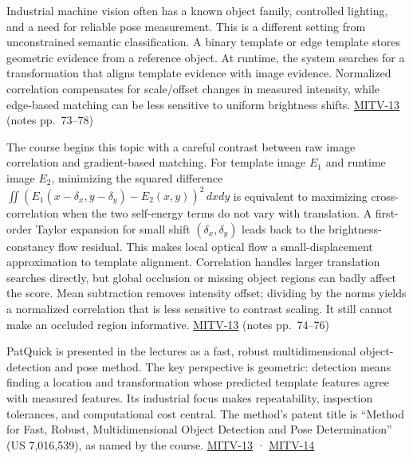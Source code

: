 Industrial machine vision often has a known object family, controlled lighting, and a need for reliable pose measurement. This is a different setting from unconstrained semantic classification. A binary template or edge template stores geometric evidence from a reference object. At runtime, the system searches for a transformation that aligns template evidence with image evidence. Normalized correlation compensates for scale/offset changes in measured intensity, while edge-based matching can be less sensitive to uniform brightness shifts. \hyperref[04-visual-computing-ii-ch036-mitv-13---object-detection-recognition-and-pose-determination-patquick-us-7016539]{MITV-13} (notes pp.~73--78)

The course begins this topic with a careful contrast between raw image correlation and gradient-based matching. For template image \(E_1\) and runtime image \(E_2\), minimizing the squared difference \(\iint(E_1(x-\delta_x,y-\delta_y)-E_2(x,y))^2\,dxdy\) is equivalent to maximizing cross-correlation when the two self-energy terms do not vary with translation. A first-order Taylor expansion for small shift \((\delta_x,\delta_y)\) leads back to the brightness-constancy flow residual. This makes local optical flow a small-displacement approximation to template alignment. Correlation handles larger translation searches directly, but global occlusion or missing object regions can badly affect the score. Mean subtraction removes intensity offset; dividing by the norms yields a normalized correlation that is less sensitive to contrast scaling. It still cannot make an occluded region informative. \hyperref[04-visual-computing-ii-ch036-mitv-13---object-detection-recognition-and-pose-determination-patquick-us-7016539]{MITV-13} (notes pp.~74--76)

PatQuick is presented in the lectures as a fast, robust multidimensional object-detection and pose method. The key perspective is geometric: detection means finding a location and transformation whose predicted template features agree with measured features. Its industrial focus makes repeatability, inspection tolerances, and computational cost central. The method's patent title is ``Method for Fast, Robust, Multidimensional Object Detection and Pose Determination'' (US 7,016,539), as named by the course. \hyperref[04-visual-computing-ii-ch036-mitv-13---object-detection-recognition-and-pose-determination-patquick-us-7016539]{MITV-13} · \hyperref[04-visual-computing-ii-ch036-mitv-14---inspection-in-patquick-hough-transform-homography-position-determination-multi-scale]{MITV-14}

